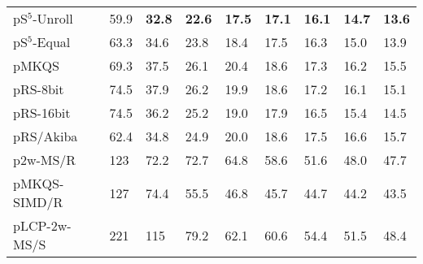 \documentclass[a4paper]{myjournal}
\begin{document}
\begin{table}
\begin{tabularx}{\linewidth}{l|*{8}{>{\hfill}X}|@{}}
pS$^5$-Unroll & 59.9 & \bf 32.8 & \bf 22.6 & \bf 17.5 & \bf 17.1 & \bf 16.1 & \bf 14.7 & \bf 13.6 \\
 pS$^5$-Equal & 63.3 &     34.6 &     23.8 &     18.4 &     17.5 &     16.3 &     15.0 &     13.9 \\
        pMKQS & 69.3 &     37.5 &     26.1 &     20.4 &     18.6 &     17.3 &     16.2 &     15.5 \\
     pRS-8bit & 74.5 &     37.9 &     26.2 &     19.9 &     18.6 &     17.2 &     16.1 &     15.1 \\
    pRS-16bit & 74.5 &     36.2 &     25.2 &     19.0 &     17.9 &     16.5 &     15.4 &     14.5 \\
    pRS/Akiba & 62.4 &     34.8 &     24.9 &     20.0 &     18.6 &     17.5 &     16.6 &     15.7 \\
     p2w-MS/R &  123 &     72.2 &     72.7 &     64.8 &     58.6 &     51.6 &     48.0 &     47.7 \\
 pMKQS-SIMD/R &  127 &     74.4 &     55.5 &     46.8 &     45.7 &     44.7 &     44.2 &     43.5 \\
 pLCP-2w-MS/S &  221 &      115 &     79.2 &     62.1 &     60.6 &     54.4 &     51.5 &     48.4 \\ \hline
\end{tabularx}
\end{table}
\end{document}

